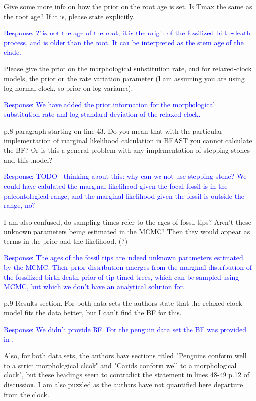 \documentclass[11pt]{article}
\newcommand{\response}[1]{\medskip{}\textcolor{blue}{{Response: #1}}\medskip{}}
\begin{document}
Give some more info on how the prior on the root age is set. Is Tmax the same as the root age? If it is, please state explicitly.

\response{$T$ is not the age of the root, it is the origin of the fossilized birth-death process, and is older than the root. It can be interpreted as the stem age of the clade.}

Please give the prior on the morphological substitution rate, and for relaxed-clock models, the prior on the rate variation parameter (I am assuming you are using log-normal clock, so prior on log-variance).

\response{We have added the prior information for the morphological substitution rate and log standard deviation of the relaxed clock.}

p.8 paragraph starting on line 43. Do you mean that with the particular implementation of marginal likelihood calculation in BEAST you cannot calculate the BF? Or is this a general problem with any implementation of stepping-stones and this model? 

\response{TODO - thinking about this: why can we not use stepping stone? We could have calulated the marginal likelihood given the focal fossil is in the paleontological range, and the marginal likelihood given the fossil is outside the range, no?}

I am also confused, do sampling times refer to the ages of fossil tips? Aren't these unknown parameters being estimated in the MCMC? Then they would appear as terms in the prior and the likelihood. (?)

\response{The ages of the fossil tips are indeed unknown parameters estimated by the MCMC. Their prior distribution emerges from the marginal distribution of the fossilized birth death prior of tip-timed trees, which can be sampled using MCMC, but which we don't have an analytical solution for.}

p.9 Results section. For both data sets the authors state that the relaxed clock model fits the data better, but I can't find the BF for this. 

\response{We didn't provide BF. For the penguin data set the BF was provided in \cite{gavryushkina2015bayesian}.}

Also, for both data sets, the authors have sections titled "Penguins conform well to a strict morphological clcok" and "Canids conform well to a morphological clock", but these headings seem to contradict the statement in lines 48-49 p.12 of discussion. I am also puzzled as the authors have not quantified here departure from the clock. 
\end{document}
